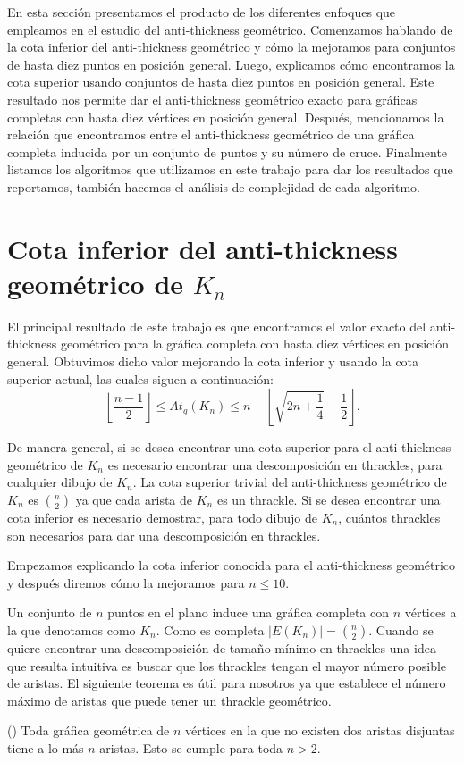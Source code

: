 En esta sección presentamos el producto de los diferentes enfoques que empleamos en el estudio del
anti-thickness geométrico. Comenzamos hablando de la cota inferior del anti-thickness geométrico y
cómo la mejoramos para conjuntos de hasta diez puntos en posición general. Luego, explicamos cómo
encontramos la cota superior usando conjuntos de hasta diez puntos en posición general. Este
resultado nos permite dar el anti-thickness geométrico exacto para gráficas completas con hasta
diez vértices en posición general. Después, mencionamos la relación que encontramos entre el
anti-thickness geométrico de una gráfica completa inducida por un conjunto de puntos y su número de
cruce. Finalmente listamos los algoritmos que utilizamos en este trabajo para dar los resultados que reportamos, también hacemos el análisis de complejidad de cada algoritmo.


\section{Cota inferior del anti-thickness geométrico de $K_n$}\label{sec:cota_inf}
  El principal resultado de este trabajo es que encontramos el valor exacto del
  anti-thickness geométrico para la gráfica completa con hasta diez vértices en
  posición general. Obtuvimos dicho valor mejorando la cota inferior y usando la cota superior actual, las cuales siguen a continuación:
  \begin{equation}
  \left\lfloor\frac{n-1}{2}\right\rfloor \leq At_g(K_n) \leq n - \left\lfloor
  \sqrt{2n + \frac{1}{4}} - \frac{1}{2} \right\rfloor.
  \label{ecuacion_cotas_atg}
  \end{equation}

  De manera general, si se desea encontrar una cota superior para el
  anti-thickness geométrico de $K_n$ es necesario encontrar una descomposición en
  thrackles, para cualquier dibujo de $K_n$. La cota superior trivial del
  anti-thickness geométrico de $K_n$ es $\binom{n}{2}$ ya que cada arista de
  $K_n$ es un thrackle. Si se desea encontrar una cota inferior es necesario
  demostrar, para todo dibujo de $K_n$, cuántos thrackles son necesarios para dar
  una descomposición en thrackles.

  Empezamos explicando la cota inferior conocida para el anti-thickness
  geométrico y después diremos cómo la mejoramos para $n\leq 10$.

  Un conjunto de $n$ puntos en el plano induce una gráfica completa con $n$
  vértices a la que denotamos como $K_n$. Como es completa $|E(K_n)|=
  \binom{n}{2}$.
  Cuando se quiere encontrar una descomposición de tamaño mínimo en thrackles una
  idea que resulta intuitiva es buscar que los thrackles tengan el mayor número
  posible de aristas. El siguiente teorema es útil para nosotros ya que establece
  el número máximo de aristas que puede tener un thrackle geométrico.
  \begin{theorem}(\cite{Pach2013b})
    Toda gráfica geométrica de $n$ vértices en la
    que no existen dos aristas disjuntas tiene a lo más $n$ aristas. Esto se
    cumple para toda $n>2$.
  \end{theorem}

